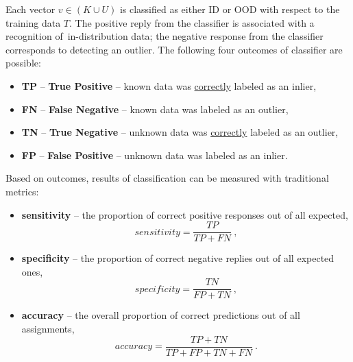 Each vector $v \in (K \cup U)$ is classified as either ID or OOD with respect to the training data $T$. The positive reply from the classifier is associated with a recognition of~in-distribution data; the negative response from the classifier corresponds to detecting an outlier. The following four outcomes of classifier are possible:
\vspace{-0.5\baselineskip}
\begin{itemize}
    \item \textbf{TP} – \textbf{True Positive} – known data was \underline{correctly} labeled as an inlier,
    \item \textbf{FN} – \textbf{False Negative} – known data was  labeled as an outlier,
    \item \textbf{TN} – \textbf{True Negative} – unknown data was \underline{correctly} labeled as an outlier,
    \item \textbf{FP} – \textbf{False Positive} – unknown data was  labeled as an inlier.
\end{itemize}
Based on outcomes, results of classification can be measured with traditional metrics:
\vspace{-0.5\baselineskip}
\begin{itemize}
    \item \textbf{sensitivity} – the proportion of correct positive responses out of all expected,
          \begin{equation}
              sensitivity
              =
              \frac{
                  TP
              }{
                  TP + FN
              }
              ~,
              \label{eq:sensitivity}
          \end{equation}
    \item \textbf{specificity} – the proportion of correct negative replies out of all expected ones,
          \begin{equation}
              specificity
              =
              \frac{
                  TN
              }{
                  FP + TN
              }
              ~,
              \label{eq:specificity}
          \end{equation}
    \item \textbf{accuracy} – the overall proportion of correct predictions out of all assignments,
          \begin{equation}
              accuracy
              =
              \frac{
                  TP + TN
              }{
                  TP + FP + TN + FN
              }
              ~.
              \label{eq:accuracy}
          \end{equation}
\end{itemize}

